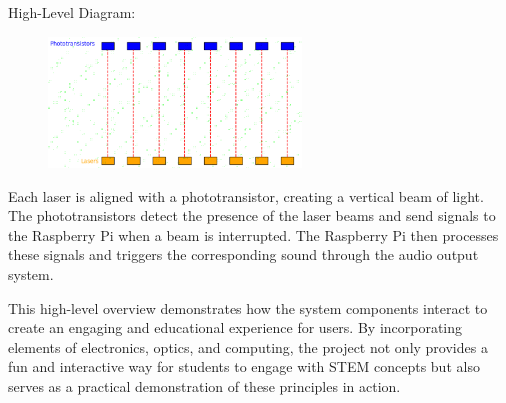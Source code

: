 High-Level Diagram:
\begin{figure}[h!]
	\centering
   	\includegraphics[width=0.60\textwidth]{images/Design.png}
\end{figure}

Each laser is aligned with a phototransistor, creating a vertical beam of light. The phototransistors detect the presence of the laser beams and send signals to the Raspberry Pi when a beam is interrupted. The Raspberry Pi then processes these signals and triggers the corresponding sound through the audio output system.

This high-level overview demonstrates how the system components interact to create an engaging and educational experience for users. By incorporating elements of electronics, optics, and computing, the project not only provides a fun and interactive way for students to engage with STEM concepts but also serves as a practical demonstration of these principles in action.
